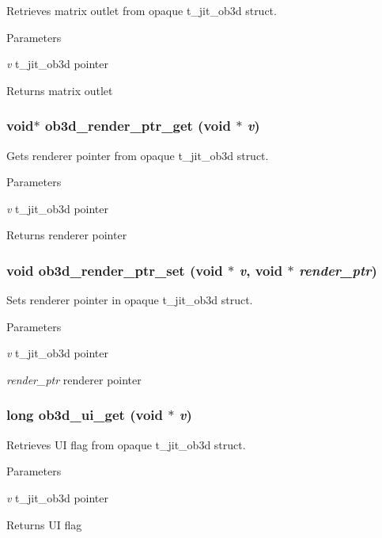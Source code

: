 Retrieves matrix outlet from opaque t\_\-jit\_\-ob3d struct. 
\begin{DoxyParams}{Parameters}
\item[{\em v}]t\_\-jit\_\-ob3d pointer\end{DoxyParams}
\begin{DoxyReturn}{Returns}
matrix outlet 
\end{DoxyReturn}
\hypertarget{group__ob3dmod_gad30ba3f5fcaf53f830d8b6430f92b4dd}{
\subsubsection[{ob3d\_\-render\_\-ptr\_\-get}]{\setlength{\rightskip}{0pt plus 5cm}void$\ast$ ob3d\_\-render\_\-ptr\_\-get (void $\ast$ {\em v})}}
\label{group__ob3dmod_gad30ba3f5fcaf53f830d8b6430f92b4dd}


Gets renderer pointer from opaque t\_\-jit\_\-ob3d struct. 
\begin{DoxyParams}{Parameters}
\item[{\em v}]t\_\-jit\_\-ob3d pointer\end{DoxyParams}
\begin{DoxyReturn}{Returns}
renderer pointer 
\end{DoxyReturn}
\hypertarget{group__ob3dmod_ga8fc47737ede14251b02ff14f78c29a99}{
\subsubsection[{ob3d\_\-render\_\-ptr\_\-set}]{\setlength{\rightskip}{0pt plus 5cm}void ob3d\_\-render\_\-ptr\_\-set (void $\ast$ {\em v}, \/  void $\ast$ {\em render\_\-ptr})}}
\label{group__ob3dmod_ga8fc47737ede14251b02ff14f78c29a99}


Sets renderer pointer in opaque t\_\-jit\_\-ob3d struct. 
\begin{DoxyParams}{Parameters}
\item[{\em v}]t\_\-jit\_\-ob3d pointer \item[{\em render\_\-ptr}]renderer pointer \end{DoxyParams}
\hypertarget{group__ob3dmod_ga37e486174b60074e0dd6b2014f88756f}{
\subsubsection[{ob3d\_\-ui\_\-get}]{\setlength{\rightskip}{0pt plus 5cm}long ob3d\_\-ui\_\-get (void $\ast$ {\em v})}}
\label{group__ob3dmod_ga37e486174b60074e0dd6b2014f88756f}


Retrieves UI flag from opaque t\_\-jit\_\-ob3d struct. 
\begin{DoxyParams}{Parameters}
\item[{\em v}]t\_\-jit\_\-ob3d pointer\end{DoxyParams}
\begin{DoxyReturn}{Returns}
UI flag 
\end{DoxyReturn}
